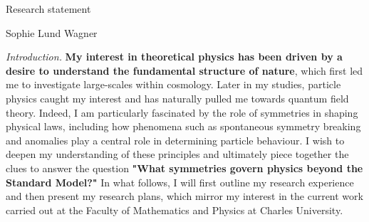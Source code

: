 \documentclass[a4paper, 11pt]{article}
\begin{document}
\vspace*{-1.25cm}
\begin{center}
    {\LARGE
    Research statement}
\end{center}
\vspace{-0.45cm}
\begin{center}
    {\large Sophie Lund Wagner}
\end{center}

\vspace{0.2cm}

\textit{Introduction.} 
\textbf{My interest in theoretical physics has been driven by a desire to understand the fundamental structure of nature}, which first led me to investigate large-scales within cosmology. Later in my studies, particle physics caught my interest and has naturally pulled me towards quantum field theory. Indeed, I am particularly fascinated by the role of symmetries in shaping physical laws, including how phenomena such as spontaneous symmetry breaking and anomalies play a central role in determining particle behaviour. I wish to deepen my understanding of these principles and ultimately piece together the clues to answer the question \textbf{"What symmetries govern physics beyond the Standard Model?"} In what follows, I will first outline my research experience and then present my research plans, which mirror my interest in the current work carried out at the Faculty of Mathematics and Physics at Charles University. \\

\end{document}
